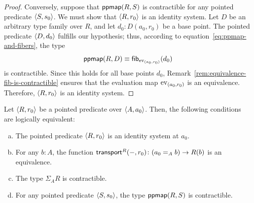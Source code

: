 \begin{proof}
    Conversely, suppose that $\mathsf{ppmap}(R,S)$ is contractible for any pointed predicate $\langle S,s_0\rangle$. We must show that $\langle R,r_0\rangle$ is an identity system. Let $D$ be an arbitrary type family over $R$, and let $d_0\colon D(a_0,r_0)$ be a base point. The pointed predicate $\langle D,d_0\rangle$ fulfills our hypothesis; thus, according to equation~\eqref{eq:ppmap-and-fibers}, the type
    \[
        \mathsf{ppmap}(R,D)\equiv\mathsf{fib}_{{\operatorname{ev}}_{(a_0,r_0)}}(d_0)
    \]
    is contractible. Since this holds for all base points $d_0$, Remark~\ref{rem:equivalence-fib-is-contractible} ensures that the evaluation map ${\operatorname{ev}}_{(a_0,r_0)}$ is an equivalence. Therefore, $\langle R,r_0\rangle$ is an identity system.
    
\end{proof}


\begin{thm}\label{thm:local=identity-system-equivalences}
    Let\/ $\langle R,r_0\rangle$ be a pointed predicate over\/ $\langle A,a_0\rangle$. Then, the following conditions are logically equivalent:
    \begin{enumerate}[a),font=\upshape]
        \item The pointed predicate\/ $\langle R,r_0\rangle$ is an identity system at\/ $a_0$.
        
        \item For any\/ $b\colon A$, the function\/ $\fun{transport}^R(\dummy,r_0)\colon(a_0\eq{A}b)\to R(b)$ is an equivalence.
        
        \item The type\/ $\Sigma_AR$ is contractible.

        \item For any pointed predicate\/ $\langle S,s_0\rangle$, the type\/ $\mathsf{ppmap}(R,S)$ is contractible.
    \end{enumerate}
\end{thm}

